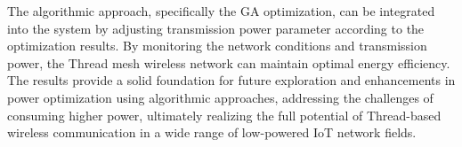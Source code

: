 The algorithmic approach, specifically the \gls{GA} optimization, can be integrated into the system by adjusting transmission power parameter according to the optimization results. By monitoring the network conditions and transmission power, the Thread mesh wireless network can maintain optimal energy efficiency. The results provide a solid foundation for future exploration and enhancements in power optimization using algorithmic approaches, addressing the challenges of consuming higher power, ultimately realizing the full potential of Thread-based wireless communication in a wide range of low-powered \gls{IoT} network fields.
